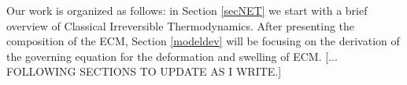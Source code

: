 Our work is organized as follows: in Section \ref{secNET} we start with a brief overview of Classical Irreversible Thermodynamics. After presenting the composition of the ECM, Section \ref{modeldev} will be focusing on the derivation of the governing equation for the deformation and swelling of ECM. [... FOLLOWING SECTIONS TO UPDATE AS I WRITE.]